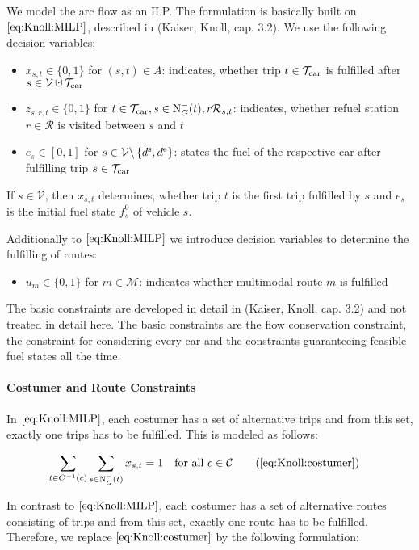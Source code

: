 We model the arc flow as an ILP. The formulation is basically built on $\eqref{eq:Knoll:MILP}$, described in (Kaiser, Knoll, cap. 3.2). We use the following decision variables:
\begin{itemize}
	\item{$x_{s,t}\in\{0,1\}$ for $(s,t)\in A$: indicates, whether trip $t\in\mathcal{T}_{\operatorname{car}}$ is fulfilled after $s\in \mathcal{V}\cupdot\Tcar$}
	\item{$z_{s,r,t}\in\{0,1\}$ for $t\in\mathcal{T}_{\operatorname{car}},s\in\operatorname{N}_G^-(t),r\mathcal{R}_{s,t}$: indicates, whether refuel station $r\in\mathcal{R}$ is visited between $s$ and $t$}
	\item{$e_s\in[0,1]$ for $s\in\mathcal{V}\backslash\left\{d^{\operatorname{s}},d^{\operatorname{e}}\right\}$: states the fuel of the respective car after fulfilling trip $s\in\mathcal{T}_{\operatorname{car}}$}
\end{itemize}

If $s\in\mathcal{V}$, then $x_{s,t}$ determines, whether trip $t$ is the first trip fulfilled by $s$ and $e_s$ is the initial fuel state $f^0_s$ of vehicle $s$.

Additionally to $\eqref{eq:Knoll:MILP}$ we introduce decision variables to determine the fulfilling of routes:

\begin{itemize}
	\item{$u_m\in\{0,1\}$ for $m\in\mathcal{M}$: indicates whether multimodal route $m$ is fulfilled}
\end{itemize}

The basic constraints are developed in detail in (Kaiser, Knoll, cap. 3.2) and not treated in detail here. The basic constraints are the flow conservation constraint, the constraint for considering every car and the constraints guaranteeing feasible fuel states all the time.

\paragraph{Costumer and Route Constraints} \parfill

In $\eqref{eq:Knoll:MILP}$, each costumer has a set of alternative trips and from this set, exactly one trips has to be fulfilled. This is modeled as follows:

\begin{align*}
	\sum_{t\in C^{-1}(c)} \sum_{s\in\Nin(t)} x_{s,t} = 1 &&& \text{for all } c\in\mathcal{C} \tag{\ref{eq:Knoll:costumer}}
\end{align*}

In contrast to $\eqref{eq:Knoll:MILP}$, each costumer has a set of alternative routes consisting of trips and from this set, exactly one route has to be fulfilled. Therefore, we replace $\eqref{eq:Knoll:costumer}$ by the following formulation:

